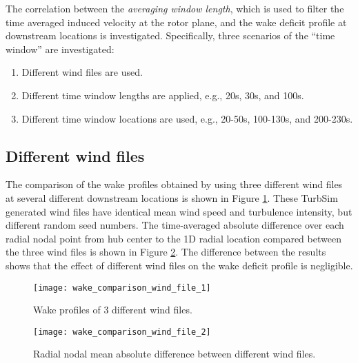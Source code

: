 \documentclass{umthesis}
\begin{document}
The correlation between the \emph{averaging window length}, which is used to filter the time averaged induced velocity at the rotor plane, and the wake deficit profile at downstream locations is investigated. Specifically, three scenarios of the “time window” are investigated:
\begin{enumerate}
  \item Different wind files are used.
  \item Different time window lengths are applied, e.g., 20s, 30s, and 100s.
  \item Different time window locations are used, e.g., 20-50s, 100-130s, and 200-230s.
\end{enumerate}

\subsection{Different wind files}
The comparison of the wake profiles obtained by using three different wind files at several different downstream locations is shown in Figure \ref{fig:wake_comparison_wind_file_1}. These TurbSim generated wind files have identical mean wind speed and turbulence intensity, but different random seed numbers. The time-averaged absolute difference over each radial nodal point from hub center to the 1D radial location compared between the three wind files is shown in Figure \ref{fig:wake_comparison_wind_file_2}. The difference between the results shows that the effect of different wind files on the wake deficit profile is negligible.
\begin{figure}
  \centering
  \texttt{[image: wake\_comparison\_wind\_file\_1]}
  \caption{Wake profiles of 3 different wind files.}\label{fig:wake_comparison_wind_file_1}
\end{figure}
\begin{figure}
  \centering
  \texttt{[image: wake\_comparison\_wind\_file\_2]}
  \caption{Radial nodal mean absolute difference between different wind files.}\label{fig:wake_comparison_wind_file_2}
\end{figure}
\end{document}
